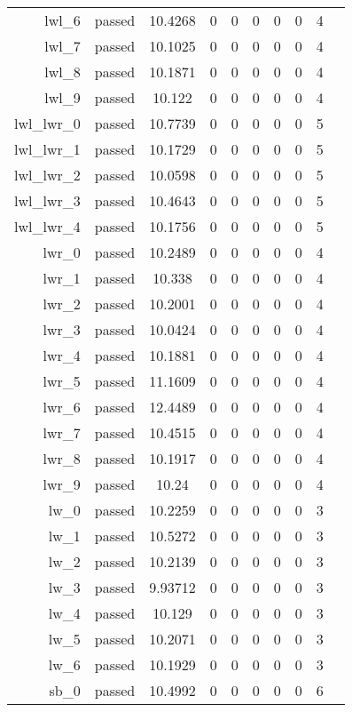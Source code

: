 \begin{longtable}{r|ccccccccc}
    lwl\_6 & passed & 10.4268 & 0 & 0 & 0 & 0 & 0 & 4 \\
    lwl\_7 & passed & 10.1025 & 0 & 0 & 0 & 0 & 0 & 4 \\
    lwl\_8 & passed & 10.1871 & 0 & 0 & 0 & 0 & 0 & 4 \\
    lwl\_9 & passed & 10.122 & 0 & 0 & 0 & 0 & 0 & 4 \\
    lwl\_lwr\_0 & passed & 10.7739 & 0 & 0 & 0 & 0 & 0 & 5 \\
    lwl\_lwr\_1 & passed & 10.1729 & 0 & 0 & 0 & 0 & 0 & 5 \\
    lwl\_lwr\_2 & passed & 10.0598 & 0 & 0 & 0 & 0 & 0 & 5 \\
    lwl\_lwr\_3 & passed & 10.4643 & 0 & 0 & 0 & 0 & 0 & 5 \\
    lwl\_lwr\_4 & passed & 10.1756 & 0 & 0 & 0 & 0 & 0 & 5 \\
    lwr\_0 & passed & 10.2489 & 0 & 0 & 0 & 0 & 0 & 4 \\
    lwr\_1 & passed & 10.338 & 0 & 0 & 0 & 0 & 0 & 4 \\
    lwr\_2 & passed & 10.2001 & 0 & 0 & 0 & 0 & 0 & 4 \\
    lwr\_3 & passed & 10.0424 & 0 & 0 & 0 & 0 & 0 & 4 \\
    lwr\_4 & passed & 10.1881 & 0 & 0 & 0 & 0 & 0 & 4 \\
    lwr\_5 & passed & 11.1609 & 0 & 0 & 0 & 0 & 0 & 4 \\
    lwr\_6 & passed & 12.4489 & 0 & 0 & 0 & 0 & 0 & 4 \\
    lwr\_7 & passed & 10.4515 & 0 & 0 & 0 & 0 & 0 & 4 \\
    lwr\_8 & passed & 10.1917 & 0 & 0 & 0 & 0 & 0 & 4 \\
    lwr\_9 & passed & 10.24 & 0 & 0 & 0 & 0 & 0 & 4 \\
    lw\_0 & passed & 10.2259 & 0 & 0 & 0 & 0 & 0 & 3 \\
    lw\_1 & passed & 10.5272 & 0 & 0 & 0 & 0 & 0 & 3 \\
    lw\_2 & passed & 10.2139 & 0 & 0 & 0 & 0 & 0 & 3 \\
    lw\_3 & passed & 9.93712 & 0 & 0 & 0 & 0 & 0 & 3 \\
    lw\_4 & passed & 10.129 & 0 & 0 & 0 & 0 & 0 & 3 \\
    lw\_5 & passed & 10.2071 & 0 & 0 & 0 & 0 & 0 & 3 \\
    lw\_6 & passed & 10.1929 & 0 & 0 & 0 & 0 & 0 & 3 \\
    sb\_0 & passed & 10.4992 & 0 & 0 & 0 & 0 & 0 & 6 \\

\end{longtable}

